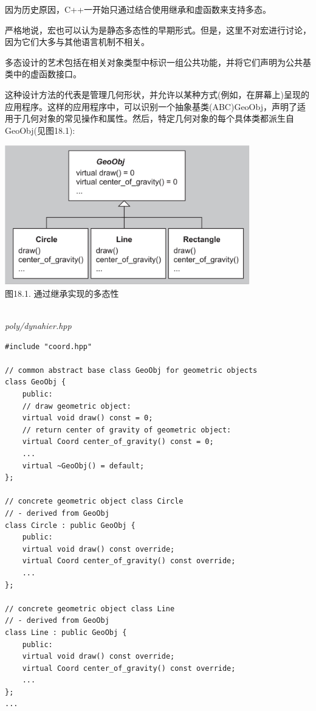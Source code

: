 
因为历史原因，C++一开始只通过结合使用继承和虚函数来支持多态。

\begin{tcolorbox}[colback=webgreen!5!white,colframe=webgreen!75!black]
\hspace*{0.75cm}严格地说，宏也可以认为是静态多态性的早期形式。但是，这里不对宏进行讨论，因为它们大多与其他语言机制不相关。
\end{tcolorbox}

多态设计的艺术包括在相关对象类型中标识一组公共功能，并将它们声明为公共基类中的虚函数接口。

这种设计方法的代表是管理几何形状，并允许以某种方式(例如，在屏幕上)呈现的应用程序。这样的应用程序中，可以识别一个抽象基类(ABC)GeoObj，声明了适用于几何对象的常见操作和属性。然后，特定几何对象的每个具体类都派生自GeoObj(见图18.1):

\begin{center}
\includegraphics[width=0.8\textwidth]{content/3/chapter18/images/1.png} \\
图18.1. 通过继承实现的多态性
\end{center}

\hspace*{\fill} \\ %
\noindent
\textit{poly/dynahier.hpp}
\begin{lstlisting}[style=styleCXX]
#include "coord.hpp"

// common abstract base class GeoObj for geometric objects
class GeoObj {
	public:
	// draw geometric object:
	virtual void draw() const = 0;
	// return center of gravity of geometric object:
	virtual Coord center_of_gravity() const = 0;
	...
	virtual ~GeoObj() = default;
};

// concrete geometric object class Circle
// - derived from GeoObj
class Circle : public GeoObj {
	public:
	virtual void draw() const override;
	virtual Coord center_of_gravity() const override;
	...
};

// concrete geometric object class Line
// - derived from GeoObj
class Line : public GeoObj {
	public:
	virtual void draw() const override;
	virtual Coord center_of_gravity() const override;
	...
};
...
\end{lstlisting}

